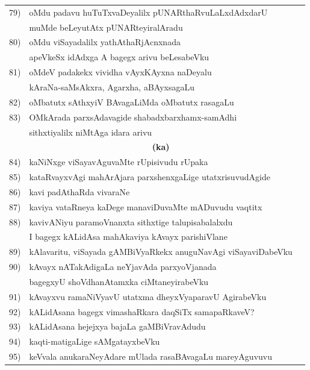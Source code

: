 {\begin{longtable}{@{}cp{7.4cm}r}
79) & oMdu padavu huTuTxvaDeyalilx pUNARthaRvuLaLxdAdxdarU  & \\ 
    & muMde beLeyutAtx pUNARteyiralAradu &  \pageref{page177}\\
80) & oMdu viSayadalilx yathAthaRjAcnxnada  & \\
    & apeVkeSx idAdxga A bagegx arivu beLesabeVku &  \pageref{page200}\\
81) & oMdeV padakekx vividha vAyxKAyxna naDeyalu  & \\
    & kAraNa-saMsAkxra, Agarxha, aBAyxsagaLu  & \pageref{page212}\\ 
82) & oMbatutx sAthxyiV BAvagaLiMda oMbatutx rasagaLu & \pageref{page230}\\ 
83) & OMkArada parxsAdavagide shabadxbarxhamx-samAdhi & \\
    & sithxtiyalilx niMtAga idara arivu & \pageref{page203}\\
    &  \multicolumn{1}{c}{\bf(ka)} & \\[0.3cm]
84) & kaNiNxge viSayavAguvaMte rUpisivudu rUpaka & \pageref{page241}\\
85) & kataRvayxvAgi mahArAjara parxshenxgaLige utatxrisuvudAgide & \pageref{page250}\\
86)  & kavi padAthaRda vivaraNe & \pageref{page184}\\
87) & kaviya vataRneya kaDege manaviDuvaMte mADuvudu vaqtitx & \pageref{page245}\\
88) & kavivANiyu paramoVnanxta sithxtige talupisabalalxdu & \\
    & I bagegx kALidAsa mahAkaviya kAvayx parishiVlane & \pageref{page232}\\    
89) & kAlavaritu, viSayada gAMBiVyaRkekx anuguNavAgi viSayaviDabeVku & \pageref{page250}\\
90) & kAvayx nATakAdigaLa neYjavAda parxyoVjanada   & \\
    & bagegxyU shoVdhanAtamxka ciMtaneyirabeVku & \pageref{page233} \\
91) & kAvayxvu ramaNiVyavU utatxma dheyxVyaparavU AgirabeVku & \pageref{page244}\\
92) & kALidAsana bagegx vimashaRkara daqSiTx samapaRkaveV? & \pageref{page233} \\
93) & kALidAsana hejejxya bajaLa gaMBiVravAdudu & \pageref{page243}\\
94) & kaqti-matigaLige sAMgatayxbeVku & \pageref{page123}\\
95) & keVvala anukaraNeyAdare mUlada rasaBAvagaLu mareyAguvuvu & \pageref{page141}\\

\end{longtable}}
